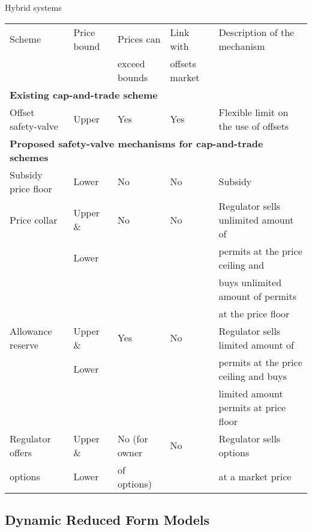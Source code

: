 {Hybrid systems }
{\tiny
\begin{table}
\centering
\begin{tabular}{|l|l|l|l|l|}
\hline
Scheme & Price bound & Prices can & Link with & Description of the mechanism \\
 &  & exceed bounds & offsets market &  \\
\hline
\hline
\multicolumn{5}{|l|}{\textbf{Existing cap-and-trade scheme}} \\
\hline
Offset safety-valve & Upper & Yes & Yes & Flexible limit on the use of offsets \\
\hline
\hline
\multicolumn{5}{|l|}{\textbf{Proposed safety-valve mechanisms for cap-and-trade schemes}} \\
\hline
Subsidy price floor & Lower & No & No & Subsidy \\
\hline
Price collar & Upper \&  & No & No & Regulator sells unlimited amount of \\
& Lower & & &                                   permits at the price ceiling and\\
  &   &  &  &                               buys unlimited amount of permits    \\
 &   &  &  &                              at the price floor \\
\hline
Allowance reserve & Upper \&  & Yes & No & Regulator sells limited amount of  \\
 & Lower  & &  &                                     permits at the price ceiling and buys  \\
 &   & &  &                                     limited amount permits at price floor \\
\hline
Regulator offers  & Upper \&  & No (for owner & No & Regulator sells options  \\
options                        &       Lower         & of options)    &    &  at a market price\\
\hline
\end{tabular}
\end{table}
}



\subsection{Dynamic Reduced Form Models}

